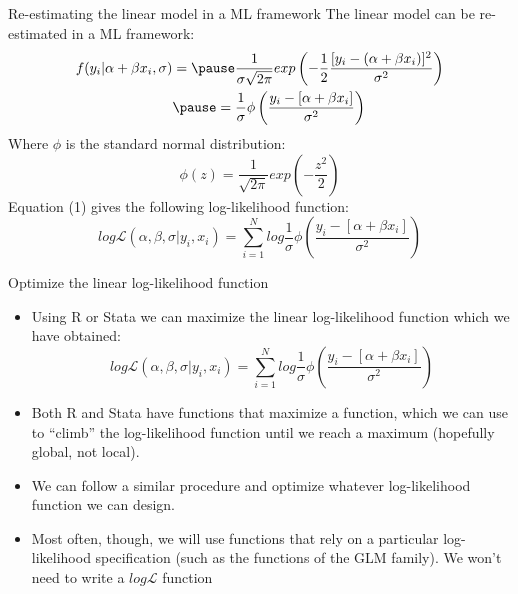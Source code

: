 \documentclass[xcolor=table,dvipsnames]{beamer}
\begin{document}
\begin{frame}{Re-estimating the linear model in a ML framework}
The linear model can be re-estimated in a ML framework: \pause
\begin{equation}
\begin{aligned}
f(y_i|\alpha+\beta x_i, \sigma) & =\pause \frac{1}{\sigma\sqrt{2\pi}} exp\left(-\frac{1}{2}\frac{[y_i - (\alpha + \beta x_i)]^2}{\sigma^2}\right)\\ & \pause =  \frac{1}{\sigma} \phi\left(\frac{y_i - [\alpha + \beta x_i]}{\sigma^2}\right)
\end{aligned}
\end{equation} \pause
Where $\phi$ is the standard normal distribution: 
$$\phi(z)=\frac{1}{\sqrt{2\pi}}exp\left(-\frac{z^2}{2}\right)$$ \pause
Equation (1) gives the following log-likelihood function: \pause
$$log \mathcal{L}(\alpha,\beta,\sigma|y_i,x_i)=\sum_{i=1}^{N} log \frac{1}{\sigma} \phi\left(\frac{y_i - [\alpha + \beta x_i]}{\sigma^2}\right)$$
\end{frame}

\begin{frame}{Optimize the linear log-likelihood function}
\begin{itemize}
\item Using R or Stata we can maximize the linear log-likelihood function which we have obtained: \pause
$$log \mathcal{L}(\alpha,\beta,\sigma|y_i,x_i)=\sum_{i=1}^{N} log \frac{1}{\sigma} \phi\left(\frac{y_i - [\alpha + \beta x_i]}{\sigma^2}\right)$$ \pause
\item Both R and Stata have functions that maximize a function, which we can use to ``climb'' the log-likelihood function until we reach a maximum (hopefully global, not local). \pause
\item We can follow a similar procedure and optimize whatever log-likelihood function we can design. \pause
\item Most often, though, we will use functions that rely on a particular log-likelihood specification (such as the functions of the GLM family). \pause We won't need to write a $log\mathcal{L}$ function
\end{itemize}
\end{frame}
\end{document}
